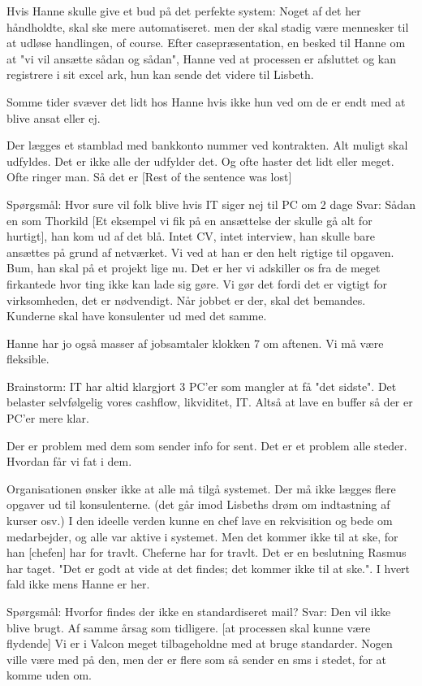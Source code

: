 Hvis Hanne skulle give et bud på det perfekte system:
Noget af det her håndholdte, skal ske mere automatiseret. men der skal stadig være mennesker til at udløse handlingen, of course. 
Efter casepræsentation, en besked til Hanne om at "vi vil ansætte sådan og sådan", Hanne ved at processen er afsluttet og kan registrere i sit excel ark, hun kan sende det videre til Lisbeth.

Somme tider svæver det lidt hos Hanne hvis ikke hun ved om de er endt med at blive ansat eller ej.

Der lægges et stamblad med bankkonto nummer ved kontrakten. Alt muligt skal udfyldes. Det er ikke alle der udfylder det. Og ofte haster det lidt eller meget. Ofte ringer man. Så det er [Rest of the sentence was lost]




Spørgsmål:
Hvor sure vil folk blive hvis IT siger nej til PC om 2 dage
Svar:
Sådan en som Thorkild [Et eksempel vi fik på en ansættelse der skulle gå alt for hurtigt], han kom ud af det blå. Intet CV, intet interview, han skulle bare ansættes på grund af netværket. Vi ved at han er den helt rigtige til opgaven. Bum, han skal på et projekt lige nu.
Det er her vi adskiller os fra de meget firkantede hvor ting ikke kan lade sig gøre. 
Vi gør det fordi det er vigtigt for virksomheden, det er nødvendigt. Når jobbet er der, skal det bemandes.
Kunderne skal have konsulenter ud med det samme.

Hanne har jo også masser af jobsamtaler klokken 7 om aftenen. Vi må være fleksible.


Brainstorm: IT har altid klargjort 3 PC'er som mangler at få "det sidste". Det belaster selvfølgelig vores cashflow, likviditet, IT.
Altså at lave en buffer så der er PC'er mere klar. 


Der er problem med dem som sender info for sent. Det er et problem alle steder. Hvordan får vi fat i dem.


Organisationen ønsker ikke at alle må tilgå systemet. Der må ikke lægges flere opgaver ud til konsulenterne. (det går imod Lisbeths drøm om indtastning af kurser osv.)
I den ideelle verden kunne en chef lave en rekvisition og bede om medarbejder, og alle var aktive i systemet. Men det kommer ikke til at ske, for han  [chefen] har for travlt.
Cheferne har for travlt. Det er en beslutning Rasmus har taget. "Det er godt at vide at det findes; det kommer ikke til at ske.". I hvert fald ikke mens Hanne er her.

Spørgsmål:
Hvorfor findes der ikke en standardiseret mail?
Svar:
Den vil ikke blive brugt. Af samme årsag som tidligere.  [at processen skal kunne være flydende]
Vi er i Valcon meget tilbageholdne med at bruge standarder.
Nogen ville være med på den, men der er flere som så sender en sms i stedet, for at komme uden om. 

